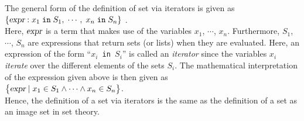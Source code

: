 The general form of the definition of set via iterators is given as
\\[0.2cm]
\hspace*{1.3cm} 
$\{ \textsl{expr} : x_1 \;\mathtt{in}\; S_1,\; \cdots,\; x_n \;\mathtt{in}\; S_n \}$ .
\\[0.2cm]
Here,  $\textsl{expr}$ is a term that makes use of the variables $x_1$, $\cdots$, $x_n$.  Furthermore,
$S_1$, $\cdots$, $S_n$ are expressions that return sets (or lists) when they are evaluated.
Here, an expression of the form ``\texttt{$x_i$ in $S_i$}'' is called an  \emph{iterator} since
the variables $x_i$ \emph{iterate} over the different elements of the sets $S_i$.
The mathematical interpretation of the expression given above is then given as
\\[0.2cm]
\hspace*{1.3cm} 
$\bigl\{ \textsl{expr} \mid x_1 \in S_1 \wedge \cdots \wedge x_n \in S_n \bigr\}$.
\\[0.2cm]
Hence, the definition of a set via iterators is the same as the definition of a set as an image set
in set theory.  

